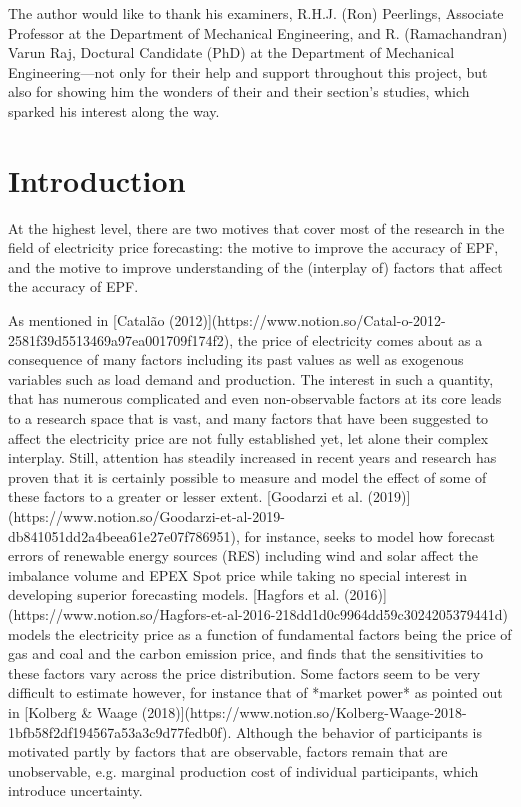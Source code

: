 The author would like to thank his examiners, R.H.J. (Ron) Peerlings, Associate Professor at the Department of Mechanical Engineering, and R. (Ramachandran) Varun Raj, Doctural Candidate (PhD) at the Department of Mechanical Engineering---not only for their help and support throughout this project, but also for showing him the wonders of their and their section's studies, which sparked his interest along the way.
\newpage
\setcounter{tocdepth}{2}
\tableofcontents
\newpage
\section{Introduction}
At the highest level, there are two motives that cover most of the research in the field of electricity price forecasting: the motive to improve the accuracy of EPF, and the motive to improve understanding of the (interplay of) factors that affect the accuracy of EPF.

As mentioned in [Catalão (2012)](https://www.notion.so/Catal-o-2012-2581f39d5513469a97ea001709f174f2), the price of electricity comes about as a consequence of many factors including its past values as well as exogenous variables such as load demand and production. The interest in such a quantity, that has numerous complicated and even non-observable factors at its core leads to a research space that is vast, and many factors that have been suggested to affect the electricity price are not fully established yet, let alone their complex interplay. Still, attention has steadily increased in recent years and research has proven that it is certainly possible to measure and model the effect of some of these factors to a greater or lesser extent. [Goodarzi et al. (2019)](https://www.notion.so/Goodarzi-et-al-2019-db841051dd2a4beea61e27e07f786951), for instance, seeks to model how forecast errors of renewable energy sources (RES) including wind and solar affect the imbalance volume and EPEX Spot price while taking no special interest in developing superior forecasting models. [Hagfors et al. (2016)](https://www.notion.so/Hagfors-et-al-2016-218dd1d0c9964dd59c3024205379441d) models the electricity price as a function of fundamental factors being the price of gas and coal and the carbon emission price, and finds that the sensitivities to these factors vary across the price distribution. Some factors seem to be very difficult to estimate however, for instance that of *market power* as pointed out in [Kolberg \& Waage (2018)](https://www.notion.so/Kolberg-Waage-2018-1bfb58f2df194567a53a3c9d77fedb0f). Although the behavior of participants is motivated partly by factors that are observable, factors remain that are unobservable, e.g. marginal production cost of individual participants, which introduce uncertainty.

